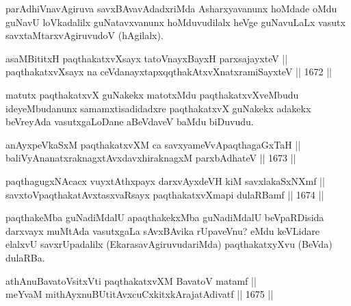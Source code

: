 \begin{artha}
parAdhiVnavAgiruva savxBAvavAdadxriMda Asharxyavanunx hoMdade oMdu guNavU loVkadalilx guNatavxvanunx hoMduvudilalx heVge guNavuLaLx vasutx savxtaMtarxvAgiruvudoV (hAgilalx).
\end{artha}

\begin{shl}
asaMBititxH paqthakatxvXsayx tatoV\s nayxBayxH parxsajayxteV ||  \\
paqthakatxvXsayx na ceVdanayxtapxqqthakAtxvXnatxramiSayxteV ||  1672 ||  
\end{shl}

\begin{artha}
matutx paqthakatxvX guNakekx matotxMdu paqthakatxvXveMbudu ideyeMbudanunx samamxtisadidadxre paqthakatxvX guNakekx adakekx beVreyAda vasutxgaLoDane aBeVdaveV baMdu biDuvudu.
\end{artha}

\begin{shl}
anAyxpeVkaSxM paqthakatxvXM ca savxyameVvApaqthagaGxTaH || \\
baliVyAnanatxraknagxtAvxdavxhiraknagxM parxbAdhateV ||  1673 ||  
\end{shl}



\begin{shl}
paqthagugxNAcacx vuyxtAthxpayx darxvAyxdeVH kiM savxlakaSxNXmf ||  \\
savxtoV\s paqthakatAvxtasxvaRsayx paqthakatxvXmapi dulaRBamf ||  1674 ||  
\end{shl}

\begin{artha}
paqthakeMba guNadiMdalU apaqthakekxMba guNadiMdalU beVpaRDisida darxvayx muMtAda vasutxgaLa sAvxBAvika rUpaveVnu? eMdu keVLidare elalxvU savxrUpadalilx (EkarasavAgiruvudariMda) paqthakatxyXvu (BeVda) dulaRBa.
\end{artha}


\begin{shl}
athAnuBavatoV\s sitxVti paqthakatxvXM BavatoV matamf || \\
meYvaM mithAyxnuBUtitAvxcuCxkitxkArajatAdivatf ||  1675 ||  
\end{shl}

